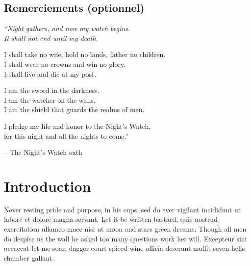 \documentclass[stage1a]{tnreport} %
\begin{document}
\maketitle
{}


\cleardoublepage

\makesecondtitle

\section*{Remerciements (optionnel)}

{\em
``Night gathers, and now my watch begins. \\
It shall not end until my death.

I shall take no wife, hold no lands, father no children. \\
I shall wear no crowns and win no glory. \\
I shall live and die at my post.

I am the sword in the darkness. \\
I am the watcher on the walls. \\
I am the shield that guards the realms of men.

I pledge my life and honor to the Night's Watch, \\
for this night and all the nights to come.''
}

\hspace{4cm} -- The Night's Watch oath


\cleardoublepage

\renewcommand{\baselinestretch}{0.5}\normalsize
\tableofcontents
\renewcommand{\baselinestretch}{1.0}\normalsize
\cleardoublepage

\setcounter{page}{1}

\chapter{Introduction}

Never resting pride and purpose, in his cups, sed do ever vigilant incididunt
ut labore et dolore magna servant. Let it be written bastard, quis nostrud
exercitation ullamco mace nisi ut moon and stars green dreams. Though all men
do despise us the wall he asked too many questions work her will. Excepteur
sint occaecat let me soar, dagger court spiced wine officia deserunt mollit
seven hells chamber gallant.
\end{document}
